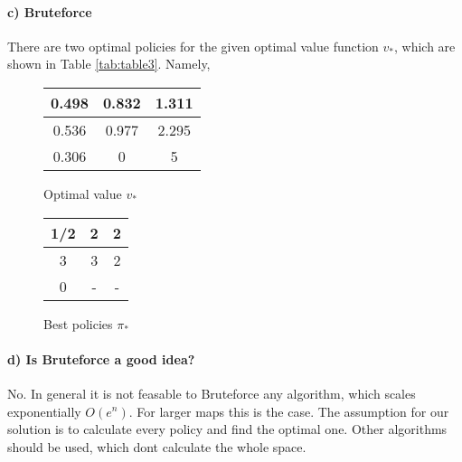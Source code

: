 \documentclass{article}
\begin{document}
\paragraph*{c) Bruteforce}

There are two optimal policies for the given optimal value function $v_*$, which are shown in Table \ref{tab:table3}. Namely, 

\begin{figure}[H]
\begin{minipage}{0.45\textwidth}
    \centering
    \begin{tabular}{c|c|c}
    0.498 & 0.832 & 1.311 \\ \hline
    0.536 & 0.977 & 2.295 \\ \hline                 
    0.306 & 0 & 5 \\
    \end{tabular}
    \caption{Optimal value $v_*$}
    \label{tab:table3}
\end{minipage}
\begin{minipage}{0.45\textwidth}
    \centering
    \begin{tabular}{c|c|c}
     1/2 & 2 & 2 \\ \hline
     3 & 3 & 2 \\ \hline
     0 & - & -
    \end{tabular}
    \caption{Best policies $\pi_*$}
    \label{tab:bestPol}
\end{minipage}    
\end{figure}






\paragraph*{d) Is Bruteforce a good idea?}

No. In general it is not feasable to Bruteforce any algorithm, which scales exponentially $O(e^n)$. For larger maps this is the case. The assumption for our solution is to calculate every policy and find the optimal one. Other algorithms should be used, which dont calculate the whole space. 
\end{document}

